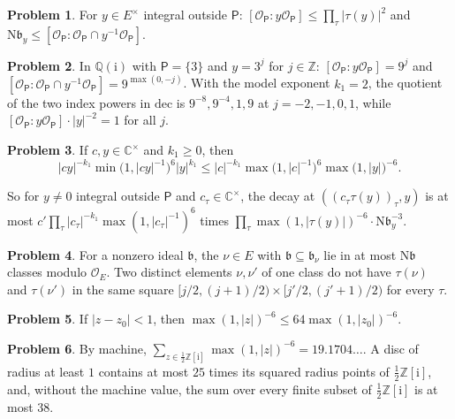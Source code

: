 \documentclass[reqno]{amsart}
\theoremstyle{definition}
\newtheorem{problem}{Problem}[section]
\theoremstyle{plain}
\theoremstyle{remark}
\newcommand{\Z}{\mathbb{Z}}
\newcommand{\Q}{\mathbb{Q}}
\newcommand{\C}{\mathbb{C}}
\newcommand{\ii}{\mathrm{i}}
\newcommand{\Oc}{\mathcal{O}}
\newcommand{\Pf}{\mathsf{P}}
\newcommand{\OP}{\mathcal{O}_{\mathsf P}}
\newcommand{\dec}{\mathrm{dec}}
\newcommand{\Nm}{\mathrm{N}}
\begin{document}
\begin{problem}\label{pr:product-formula}
For \(y\in E^\times\) integral outside \(\Pf\): \([\OP:y\OP]\le\prod_\tau\lvert\tau(y)\rvert^2\) and \(\Nm\mathfrak b_y\le[\OP:\OP\cap y^{-1}\OP]\).
\end{problem}

\begin{problem}\label{pr:inert}
In \(\Q(\ii)\) with \(\Pf=\{3\}\) and \(y=3^j\) for \(j\in\Z\): \([\OP:y\OP]=9^j\) and \([\OP:\OP\cap y^{-1}\OP]=9^{\max(0,-j)}\).  With the model exponent \(k_1=2\), the quotient of the two index powers in \(\dec\) is \(9^{-8},9^{-4},1,9\) at \(j=-2,-1,0,1\), while \([\OP:y\OP]\cdot\lvert y\rvert^{-2}=1\) for all \(j\).
\end{problem}

\begin{problem}\label{pr:one-place}
If \(c,y\in\C^\times\) and \(k_1\ge0\), then
\[
 \lvert cy\rvert^{-k_1}\min\bigl(1,\lvert cy\rvert^{-1}\bigr)^6\lvert y\rvert^{k_1}\le\lvert c\rvert^{-k_1}\max\bigl(1,\lvert c\rvert^{-1}\bigr)^6\max\bigl(1,\lvert y\rvert\bigr)^{-6}.
\]
\end{problem}

So for \(y\ne0\) integral outside \(\Pf\) and \(c_\tau\in\C^\times\), the decay at \(((c_\tau\tau(y))_\tau,y)\) is at most \(c'\prod_\tau\lvert c_\tau\rvert^{-k_1}\max(1,\lvert c_\tau\rvert^{-1})^6\) times \(\prod_\tau\max(1,\lvert\tau(y)\rvert)^{-6}\cdot\Nm\mathfrak b_y^{-3}\).

\begin{problem}\label{pr:cosets}
For a nonzero ideal \(\mathfrak b\), the \(\nu\in E\) with \(\mathfrak b\subseteq\mathfrak b_\nu\) lie in at most \(\Nm\mathfrak b\) classes modulo \(\Oc_E\).  Two distinct elements \(\nu,\nu'\) of one class do not have \(\tau(\nu)\) and \(\tau(\nu')\) in the same square \([j/2,(j+1)/2)\times[j'/2,(j'+1)/2)\) for every \(\tau\).
\end{problem}

\begin{problem}\label{pr:corner-weight}
If \(\lvert z-z_0\rvert<1\), then \(\max(1,\lvert z\rvert)^{-6}\le64\max(1,\lvert z_0\rvert)^{-6}\).
\end{problem}

\begin{problem}\label{pr:corner-sum}
By machine, \(\sum_{z\in\frac12\Z[\ii]}\max(1,\lvert z\rvert)^{-6}=19.1704\ldots\).  A disc of radius at least \(1\) contains at most \(25\) times its squared radius points of \(\frac12\Z[\ii]\), and, without the machine value, the sum over every finite subset of \(\frac12\Z[\ii]\) is at most \(38\).
\end{problem}
\end{document}
